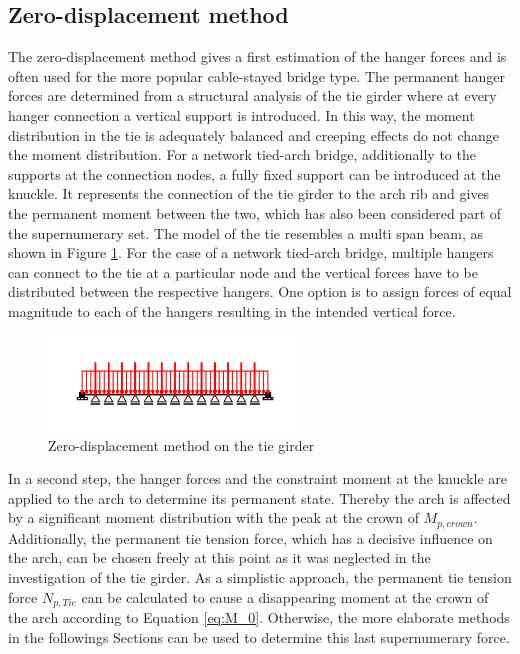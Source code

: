 \subsection{Zero-displacement method}
The zero-displacement method gives a first estimation of the hanger forces and is often used for the more popular cable-stayed bridge type. The permanent hanger forces are determined from a structural analysis of the tie girder where at every hanger connection a vertical support is introduced. In this way, the moment distribution in the tie is adequately balanced and creeping effects do not change the moment distribution. For a network tied-arch bridge, additionally to the supports at the connection nodes, a fully fixed support can be introduced at the knuckle. It represents the connection of the tie girder to the arch rib and gives the permanent moment between the two, which has also been considered part of the supernumerary set. The model of the tie resembles a multi span beam, as shown in Figure \ref{fig:zero_disp}. For the case of a network tied-arch bridge, multiple hangers can connect to the tie at a particular node and the vertical forces have to be distributed between the respective hangers. One option is to assign forces of equal magnitude to each of the hangers resulting in the intended vertical force. 

\begin{figure}[H]
    \centering
    \includegraphics[trim={0 1cm 0 1cm},clip,width=0.6\textwidth]{illustrations/optimisation methods/zero-displacement.png}
    \caption{Zero-displacement method on the tie girder}
    \label{fig:zero_disp}
\end{figure}

In a second step, the hanger forces and the constraint moment at the knuckle are applied to the arch to determine its permanent state. Thereby the arch is affected by a significant moment distribution with the peak at the crown of $M_{p,crown}$. Additionally, the permanent tie tension force, which has a decisive influence on the arch, can be chosen freely at this point as it was neglected in the investigation of the tie girder. As a simplistic approach, the permanent tie tension force $N_{p,Tie}$ can be calculated to cause a disappearing moment at the crown of the arch according to Equation \ref{eq:M_0}. Otherwise, the more elaborate methods in the followings Sections can be used to determine this last supernumerary force.

